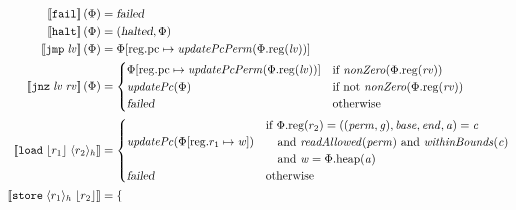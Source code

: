 \documentclass[a4paper]{article}
\newcommand{\update}[2]{[#1 \mapsto #2]}
\newcommand{\sem}[1]{\left\llbracket #1 \right\rrbracket}
\newcommand{\var}[1]{\mathit{#1}}
\newcommand{\rv}{\var{rv}}
\newcommand{\lv}{\var{lv}}
\newcommand{\gl}{\var{g}}
\newcommand{\pcreg}{\mathrm{pc}}
\newcommand{\addr}{\var{a}}
\newcommand{\start}{\var{base}}
\newcommand{\addrend}{\var{end}}
\newcommand{\perm}{\var{perm}}
\newcommand{\stdcap}[1][(\perm,\gl)]{\left(#1,\start,\addrend,\addr \right)}
\newcommand{\plainproj}[1]{\mathrm{#1}}
\newcommand{\memheap}[1][\Phi]{#1.\plainproj{heap}}
\newcommand{\memreg}[1][\Phi]{#1.\plainproj{reg}}
\newcommand{\updateReg}[3][\Phi]{#1\update{\plainproj{reg}.#2}{#3}}
\newcommand{\failed}{\textsl{failed}}
\newcommand{\halted}{\textsl{halted}}
\newcommand{\plainfun}[2]{
  \ifthenelse{\equal{#2}{}}
             {\mathit{#1}}
             {\mathit{#1}(#2)}
}
\newcommand{\updatePcPerm}[1]{\plainfun{updatePcPerm}{#1}}
\newcommand{\nonZero}[1]{\plainfun{nonZero}{#1}}
\newcommand{\readAllowed}[1]{\plainfun{readAllowed}{#1}}
\newcommand{\withinBounds}[1]{\plainfun{withinBounds}{#1}}
\newcommand{\stdUpdatePc}[1]{\plainfun{updatePc}{#1}}
\newcommand{\refreg}[1]{\lfloor #1 \rfloor}
\newcommand{\refheap}[1]{\langle #1 \rangle_h}
\newcommand{\zinstr}[1]{\mathtt{#1}}
\newcommand{\fail}{\zinstr{fail}}
\newcommand{\halt}{\zinstr{halt}}
\newcommand{\oneinstr}[2]{\zinstr{#1} \; #2}
\newcommand{\jmp}[1]{\oneinstr{jmp}{#1}}
\newcommand{\twoinstr}[3]{\zinstr{#1} \; #2 \; #3}
\newcommand{\jnz}[2]{\twoinstr{jnz}{#1}{#2}}
\newcommand{\store}[2]{\twoinstr{store}{#1}{#2}}
\newcommand{\load}[2]{\twoinstr{load}{#1}{#2}}
\begin{document}
\begin{align*}
  \sem{\fail}(\Phi)                        & = \failed \\
  \sem{\halt}(\Phi)                        & = (\halted,\Phi) \\
  \sem{\jmp{\lv}}(\Phi)                    & = \updateReg{\pcreg}{\updatePcPerm{\memreg(\lv)}} \\
  \sem{\jnz{\lv}{\rv}}(\Phi)               & = 
                                             \begin{cases}
                                               \updateReg{\pcreg}{\updatePcPerm{\memreg(\lv)}} &
                                               \arraycolsep=0pt
                                               \begin{array}{l}
                                                 \text{if $\nonZero{\memreg(\rv)}$} 
                                               \end{array}\\
                                               \stdUpdatePc{\Phi} & \text{if not $\nonZero{\memreg(\rv)}$}\\
                                               \failed & \text{otherwise }
                                             \end{cases} \\
 \sem{\load{\refreg{r_1}}{\refheap{r_2}}}  & = 
                                             \begin{cases}
                                               \stdUpdatePc{\updateReg{r_1}{\var{w}}} &
                                               \arraycolsep=0pt
                                               \begin{array}{l}
                                                 \text{if }\memreg(r_2) = \stdcap = \var{c} \\
                                                 \quad\text{and }\readAllowed{\perm} \text{ and } \withinBounds{\var{c}} \\
                                                 \quad\text{and }\var{w} = \memheap(\addr)
                                               \end{array}\\
                                               \failed & \text{otherwise }
                                             \end{cases}\\
 \sem{\store{\refheap{r_1}}{\refreg{r_2}}} & = 
                                             \begin{cases}

\end{cases}
\end{align*}
\end{document}
